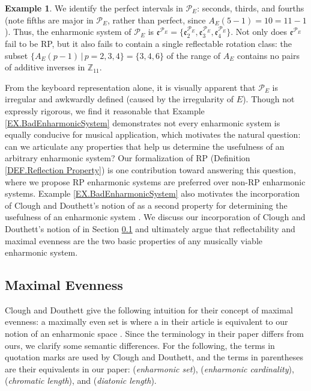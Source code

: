 \documentclass{article}
\theoremstyle{plain}
\theoremstyle{definition}
\newtheorem{example}[theorem]{Example}
\theoremstyle{remark}
\begin{document}
\begin{example}
	We identify the perfect intervals in $\mathcal{P}_E$: seconds, thirds, and fourths (note fifths are major in $\mathcal{P}_E$, rather than perfect, since $A_E(5-1)=10=11-1$). Thus, the enharmonic system of $\mathcal{P}_E$ is $\mathfrak{e}^{\mathcal{P}_E}=\{\mathfrak{e}_2^{\mathcal{P}_E},\mathfrak{e}_3^{\mathcal{P}_E},\mathfrak{e}_4^{\mathcal{P}_E}\}$. Not only does $\mathfrak{e}^{\mathcal{P}_E}$ fail to be RP, but it also fails to contain a single reflectable rotation class: the subset $\{A_E(p-1)\,|\,p=2,3,4\}=\{3,4,6\}$ of the range of $A_E$ contains no pairs of additive inverses in $\mathbb{Z}_{11}$.
\end{example}

From the keyboard representation alone, it is visually apparent that $\mathcal{P}_E$ is irregular and awkwardly defined (caused by the irregularity of $E$). Though not expressly rigorous, we find it reasonable that Example \ref{EX.BadEnharmonicSystem} demonstrates not every enharmonic system is equally conducive for musical application, which motivates the natural question: can we articulate any properties that help us determine the usefulness of an arbitrary enharmonic system? Our formalization of RP (Definition \ref{DEF.Reflection Property}) is one contribution toward answering this question, where we propose RP enharmonic systems are preferred over non-RP enharmonic systems. Example \ref{EX.BadEnharmonicSystem} also motivates the incorporation of Clough and Douthett's notion of  as a second property for determining the usefulness of an enharmonic system \cite{Clough_Douthett}. We discuss our incorporation of Clough and Douthett's notion of  in Section \ref{SSEC.Maximal Evenness} and ultimately argue that reflectability and maximal evenness are the two basic properties of any musically viable enharmonic system.

\subsection{Maximal Evenness}
\label{SSEC.Maximal Evenness}

Clough and Douthett give the following intuition for their concept of maximal evenness: a maximally even set is  where a  in their article is equivalent to our notion of an enharmonic space \cite{Clough_Douthett}. Since the terminology in their paper differs from ours, we clarify some semantic differences. For the following, the terms in quotation marks are used by Clough and Douthett, and the terms in parentheses are their equivalents in our paper:  (\textit{enharmonic set}),  (\textit{enharmonic cardinality}),  (\textit{chromatic length}), and  (\textit{diatonic length}).
\end{document}
